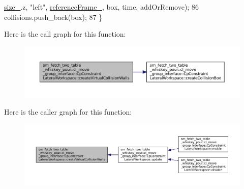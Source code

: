 \begin{DoxyCode}
      \hyperlink{classsm__fetch__two__table__whiskey__pour_1_1cl__move__group__interface_1_1CpConstraintLateralWorkspace_a5d475923640591717dff98683928e89f}{size\_}.z, \textcolor{stringliteral}{"left"}, \hyperlink{classsm__fetch__two__table__whiskey__pour_1_1cl__move__group__interface_1_1CpConstraintLateralWorkspace_af3a787dd9bdfa58d57270935af39b69b}{referenceFrame\_}, box, time, addOrRemove);
86             collisions.push\_back(box);
87         \}
\end{DoxyCode}
Here is the call graph for this function\+:
\nopagebreak
\begin{figure}[H]
\begin{center}
\leavevmode
\includegraphics[width=350pt]{classsm__fetch__two__table__whiskey__pour_1_1cl__move__group__interface_1_1CpConstraintLateralWorkspace_ac4f1fdc1009b0a351c17b938f8cca1fd_cgraph}
\end{center}
\end{figure}
Here is the caller graph for this function\+:
\nopagebreak
\begin{figure}[H]
\begin{center}
\leavevmode
\includegraphics[width=350pt]{classsm__fetch__two__table__whiskey__pour_1_1cl__move__group__interface_1_1CpConstraintLateralWorkspace_ac4f1fdc1009b0a351c17b938f8cca1fd_icgraph}
\end{center}
\end{figure}
\mbox{\label{classsm__fetch__two__table__whiskey__pour_1_1cl__move__group__interface_1_1CpConstraintLateralWorkspace_a7c8d663804f6edc1d3c79a0e37f9a82f}} 
